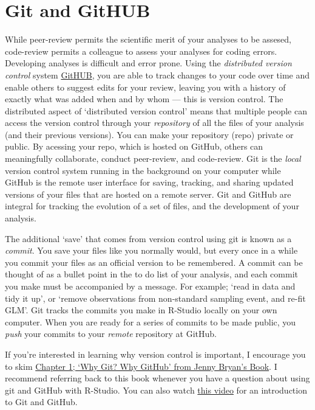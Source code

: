 \documentclass[]{book}
\begin{document}
\section{Git and GitHUB}\label{git-and-github}

While peer-review permits the scientific merit of your analyses to be
assesed, code-review permits a colleague to assess your analyses for
coding errors. Developing analyses is difficult and error prone. Using
the \emph{distributed version control} system
\href{https://git-scm.com/book/en/v2/Getting-Started-About-Version-Control}{GitHUB},
you are able to track changes to your code over time and enable others
to suggest edits for your review, leaving you with a history of exactly
what was added when and by whom --- this is version control. The
distributed aspect of `distributed version control' means that multiple
people can access the version control through your \emph{repository} of
all the files of your analysis (and their previous versions). You can
make your repository (repo) private or public. By acessing your repo,
which is hosted on GitHub, others can meaningfully collaborate, conduct
peer-review, and code-review. Git is the \emph{local} version control
system running in the background on your computer while GitHub is the
remote user interface for saving, tracking, and sharing updated versions
of your files that are hosted on a remote server. Git and GitHub are
integral for tracking the evolution of a set of files, and the
development of your analysis.

The additional `save' that comes from version control using git is known
as a \emph{commit}. You save your files like you normally would, but
every once in a while you commit your files as an official version to be
remembered. A commit can be thought of as a bullet point in the to do
list of your analysis, and each commit you make must be accompanied by a
message. For example; `read in data and tidy it up', or `remove
observations from non-standard sampling event, and re-fit GLM'. Git
tracks the commits you make in R-Studio locally on your own computer.
When you are ready for a series of commits to be made public, you
\emph{push} your commits to your \emph{remote} repository at GitHub.

If you're interested in learning why version control is important, I
encourage you to skim
\href{http://happygitwithr.com/big-picture.html\#why-git}{Chapter 1;
`Why Git? Why GitHub' from Jenny Bryan's Book}. I recommend referring
back to this book whenever you have a question about using git and
GitHub with R-Studio. You can also watch
\href{https://www.youtube.com/watch?v=FyfwLX4HAxM}{this video} for an
introduction to Git and GitHub.
\end{document}
